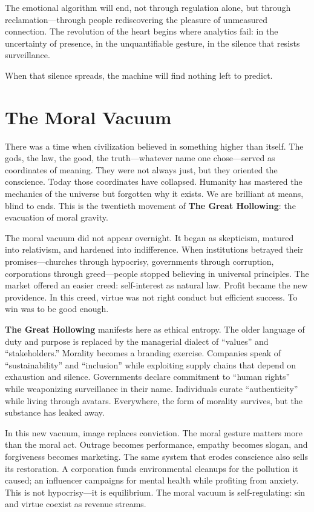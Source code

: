 \documentclass[11pt,twoside]{book}
\begin{document}
The emotional algorithm will end, not through regulation alone, but through reclamation—through people rediscovering the pleasure of unmeasured connection.  The revolution of the heart begins where analytics fail: in the uncertainty of presence, in the unquantifiable gesture, in the silence that resists surveillance.

When that silence spreads, the machine will find nothing left to predict.

%
\chapter{The Moral Vacuum}
\label{ch:22.1}

There was a time when civilization believed in something higher than itself.  
The gods, the law, the good, the truth—whatever name one chose—served as coordinates of meaning.  They were not always just, but they oriented the conscience.  Today those coordinates have collapsed.  Humanity has mastered the mechanics of the universe but forgotten why it exists.  We are brilliant at means, blind to ends.  This is the twentieth movement of \textbf{The Great Hollowing}: the evacuation of moral gravity.

The moral vacuum did not appear overnight.  It began as skepticism, matured into relativism, and hardened into indifference.  When institutions betrayed their promises—churches through hypocrisy, governments through corruption, corporations through greed—people stopped believing in universal principles.  The market offered an easier creed: self-interest as natural law.  Profit became the new providence.  In this creed, virtue was not right conduct but efficient success.  To win was to be good enough.

\textbf{The Great Hollowing} manifests here as ethical entropy.  The older language of duty and purpose is replaced by the managerial dialect of “values” and “stakeholders.”  Morality becomes a branding exercise.  Companies speak of “sustainability” and “inclusion” while exploiting supply chains that depend on exhaustion and silence.  Governments declare commitment to “human rights” while weaponizing surveillance in their name.  Individuals curate “authenticity” while living through avatars.  Everywhere, the form of morality survives, but the substance has leaked away.

In this new vacuum, image replaces conviction.  The moral gesture matters more than the moral act.  Outrage becomes performance, empathy becomes slogan, and forgiveness becomes marketing.  The same system that erodes conscience also sells its restoration.  A corporation funds environmental cleanups for the pollution it caused; an influencer campaigns for mental health while profiting from anxiety.  This is not hypocrisy—it is equilibrium.  The moral vacuum is self-regulating: sin and virtue coexist as revenue streams.
\end{document}
